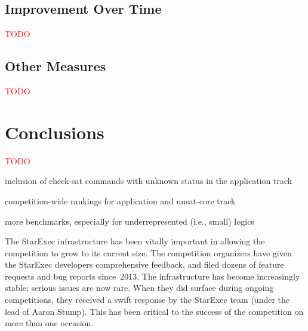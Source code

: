\documentclass[twoside,11pt]{article}
\newcommand{\TODO}[0]{\textcolor{red}{TODO}}
\begin{document}
\subsection{Improvement Over Time}

\TODO

\subsection{Other Measures}

\TODO


\section{Conclusions}
\label{sec:conclusions}

\TODO

inclusion of check-sat commands with unknown status in the application track

competition-wide rankings for application and unsat-core track

more benchmarks, especially for underrepresented (i.e., small) logics


The StarExec infrastructure has been vitally important in allowing the
competition to grow to its current size.  The competition organizers
have given the StarExec developers comprehensive feedback, and filed
dozens of feature requests and bug reports since~2013.  The
infrastructure has become increasingly stable; serious issues are now
rare.  When they did surface during ongoing competitions, they
received a swift response by the StarExec team (under the lead of
Aaron Stump).  This has been critical to the success of the
competition on more than one occasion.





\end{document}
